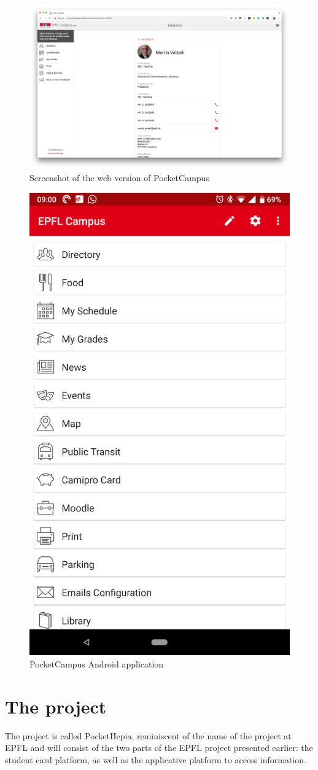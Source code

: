 \documentclass[11pt,a4paper]{report}
\begin{document}
\begin{figure}[H]
\begin{center}
	\includegraphics[width=.8\textwidth]{assets/web_pocketcampus.png}
	\caption{Screenshot of the web version of PocketCampus}
\end{center}
\end{figure}
\begin{figure}[H]
\begin{center}
	\includegraphics[width=.5\textwidth]{assets/pocketcampus_mobile.png}
	\caption{PocketCampus Android application}
\end{center}
\end{figure}

\chapter{The project}
The project is called PocketHepia, reminiscent of the name of the project at EPFL and will consist of the two parts of the EPFL project presented earlier: the student card platform, as well as the applicative platform to access information.\\
\end{document}
